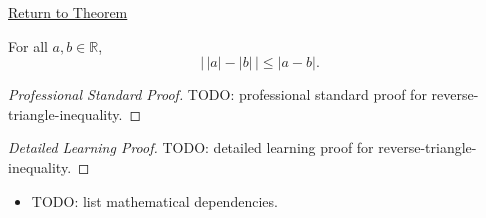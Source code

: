 \newpage
{}
\label{prf:reverse-triangle-inequality}

\begin{remark*}[Return]
\hyperref[thm:reverse-triangle-inequality]{Return to Theorem}
\end{remark*}

\begin{theorem*}
For all $a, b \in \mathbb{R}$,
\[
  \lvert\, \lvert a \rvert - \lvert b \rvert \,\rvert
  \le \lvert a - b \rvert.
\]
\end{theorem*}

\begin{proof}[Professional Standard Proof]
\LRAProofBodyStart
TODO: professional standard proof for reverse-triangle-inequality.
\end{proof}

\begin{proof}[Detailed Learning Proof]
\LRAProofBodyStart
TODO: detailed learning proof for reverse-triangle-inequality.
\end{proof}

\begin{remark*}
\end{remark*}

\begin{dependencies}
\begin{itemize}
  \item TODO: list mathematical dependencies.
\end{itemize}
\end{dependencies}

\clearpage

